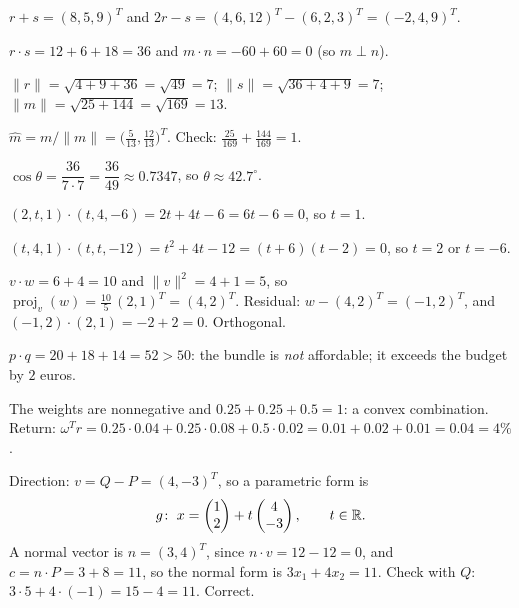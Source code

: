 \begin{solutions}
  \item $r + s = (8, 5, 9)^{T}$ and
        $2 r - s = (4, 6, 12)^{T} - (6, 2, 3)^{T} = (-2, 4, 9)^{T}$.

  \item $r \cdot s = 12 + 6 + 18 = 36$ and
        $m \cdot n = -60 + 60 = 0$ (so $m \perp n$).

  \item $\|r\| = \sqrt{4 + 9 + 36} = \sqrt{49} = 7$;\;
        $\|s\| = \sqrt{36 + 4 + 9} = 7$;\;
        $\|m\| = \sqrt{25 + 144} = \sqrt{169} = 13$.

  \item $\hat{m} = m / \|m\|
        = \bigl(\tfrac{5}{13}, \tfrac{12}{13}\bigr)^{T}$.
        Check: $\tfrac{25}{169} + \tfrac{144}{169} = 1$.

  \item $\cos \theta = \dfrac{36}{7 \cdot 7} = \dfrac{36}{49} \approx
        0.7347$, so $\theta \approx 42.7^{\circ}$.

  \item $(2, t, 1) \cdot (t, 4, -6) = 2 t + 4 t - 6 = 6 t - 6 = 0$, so
        $t = 1$.

  \item $(t, 4, 1) \cdot (t, t, -12) = t^{2} + 4 t - 12 = (t + 6)(t - 2)
        = 0$, so $t = 2$ or $t = -6$.

  \item $v \cdot w = 6 + 4 = 10$ and $\|v\|^{2} = 4 + 1 = 5$, so
        $\operatorname{proj}_{v}(w) = \tfrac{10}{5} \, (2, 1)^{T}
        = (4, 2)^{T}$. Residual: $w - (4, 2)^{T} = (-1, 2)^{T}$, and
        $(-1, 2) \cdot (2, 1) = -2 + 2 = 0$. Orthogonal.

  \item $p \cdot q = 20 + 18 + 14 = 52 > 50$: the bundle is \emph{not}
        affordable; it exceeds the budget by $2$ euros.

  \item The weights are nonnegative and $0.25 + 0.25 + 0.5 = 1$: a convex
        combination. Return:
        $\omega^{T} r = 0.25 \cdot 0.04 + 0.25 \cdot 0.08 + 0.5 \cdot 0.02
        = 0.01 + 0.02 + 0.01 = 0.04 = 4\%$.

  \item Direction: $v = Q - P = (4, -3)^{T}$, so a parametric form is
        \[
        g\colon\; x = \begin{pmatrix} 1 \\ 2 \end{pmatrix}
        + t \begin{pmatrix} 4 \\ -3 \end{pmatrix}, \qquad t \in \mathbb{R} .
        \]
        A normal vector is $n = (3, 4)^{T}$, since
        $n \cdot v = 12 - 12 = 0$, and $c = n \cdot P = 3 + 8 = 11$, so
        the normal form is $3 x_{1} + 4 x_{2} = 11$. Check with $Q$:
        $3 \cdot 5 + 4 \cdot (-1) = 15 - 4 = 11$. Correct.


\end{solutions}
